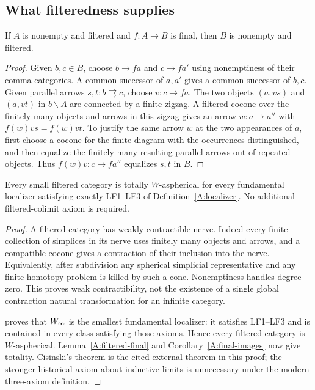 \subsection{What filteredness supplies}

\begin{lemma}\label{A:filtered-final}
If $A$ is nonempty and filtered and $f:A\to B$ is final, then $B$ is nonempty and filtered.
\end{lemma}

\begin{proof}
Given $b,c\in B$, choose $b\to fa$ and $c\to fa'$ using nonemptiness of their comma categories. A common successor of $a,a'$ gives a common successor of $b,c$. Given parallel arrows $s,t:b\rightrightarrows c$, choose $v:c\to fa$. The two objects $(a,vs)$ and $(a,vt)$ in $b\backslash A$ are connected by a finite zigzag. A filtered cocone over the finitely many objects and arrows in this zigzag gives an arrow $w:a\to a''$ with $f(w)vs=f(w)vt$. To justify the same arrow $w$ at the two appearances of $a$, first choose a cocone for the finite diagram with the occurrences distinguished, and then equalize the finitely many resulting parallel arrows out of repeated objects. Thus $f(w)v:c\to fa''$ equalizes $s,t$ in $B$.
\end{proof}

\begin{theorem}\label{A:filtered}
Every small filtered category is totally $W$-aspherical for every fundamental localizer satisfying exactly LF1--LF3 of Definition~\ref{A:localizer}. No additional filtered-colimit axiom is required.
\end{theorem}

\begin{proof}
A filtered category has weakly contractible nerve. Indeed every finite collection of simplices in its nerve uses finitely many objects and arrows, and a compatible cocone gives a contraction of their inclusion into the nerve. Equivalently, after subdivision any spherical simplicial representative and any finite homotopy problem is killed by such a cone. Nonemptiness handles degree zero. This proves weak contractibility, not the existence of a single global contraction natural transformation for an infinite category.

\citet[Theorem 2.2.11, p.~136]{Cisinski2004Minimal} proves that $W_{\infty}$ is the smallest fundamental localizer: it satisfies LF1--LF3 and is contained in every class satisfying those axioms. Hence every filtered category is $W$-aspherical. Lemma~\ref{A:filtered-final} and Corollary~\ref{A:final-images} now give totality. Cisinski's theorem is the cited external theorem in this proof; the stronger historical axiom about inductive limits is unnecessary under the modern three-axiom definition.
\end{proof}

